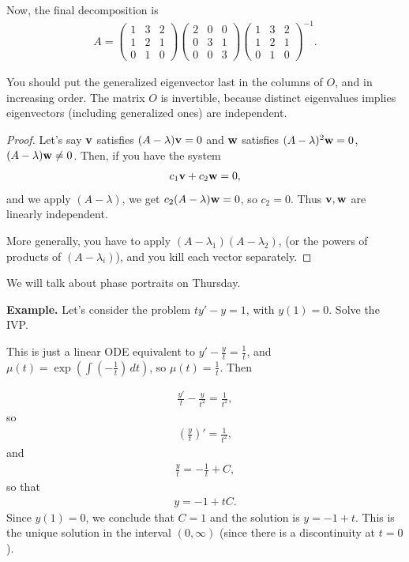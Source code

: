 \documentclass{article}
\newcommand{\mat}[1]{\begin{pmatrix}#1\end{pmatrix}}
\begin{document}
Now, the final decomposition is
\begin{align*}
  A = \mat{1 & 3 & 2 \\ 1 & 2 & 1 \\ 0 & 1 & 0} \mat{2 & 0 & 0 \\ 0 & 3 & 1 \\ 0 & 0 & 3} \mat{1 & 3 & 2 \\ 1 & 2 & 1 \\ 0 & 1 & 0}^{-1}.
\end{align*}

You should put the generalized eigenvector last in the columns of $O$, and in increasing order.  The matrix $O$ is invertible, because distinct eigenvalues implies eigenvectors (including generalized ones) are independent.

\begin{proof}
  Let's say $\mathbf{v}$ satisfies $(A - \lambda) \mathbf{v} = 0$ and $\mathbf{w}$ satisfies $(A - \lambda)^2 \mathbf{w} = 0$, $(A - \lambda) \mathbf{w} \neq 0$.  Then, if you have the system
  \begin{align*}
    c_1 \mathbf{v} + c_2 \mathbf{w} = 0,
  \end{align*}
  and we apply $(A - \lambda)$, we get $c_2 (A - \lambda) \mathbf{w} = 0$, so $c_2 = 0$.  Thus $\mathbf{v}, \mathbf{w}$ are linearly independent.

  More generally, you have to apply $(A-\lambda_1)(A - \lambda_2)$, (or the powers of products of $(A - \lambda_i)$), and you kill each vector separately.
\end{proof}

We will talk about phase portraits on Thursday.

{\bf Example.} Let's consider the problem $ty' - y = 1$, with $y(1) = 0$.  Solve the IVP.

This is just a linear ODE equivalent to $y' - \frac{y}{t} = \frac{1}{t}$, and $\mu(t) = \exp \left( \int (-\frac{1}{t}) \, dt \right)$, so $\mu(t)= \frac{1}{t}$.  Then

\begin{align*}
  \frac{y'}{t} - \frac{y}{t^2} = \frac{1}{t^2},
\end{align*}
so
\begin{align*}
  (\frac{y}{t})' = \frac{1}{t^2},
\end{align*}
and
\begin{align*}
  \frac{y}{t} = - \frac{1}{t}  +C,
\end{align*}
so that
\begin{align*}
  y = - 1 + tC.
\end{align*}
Since $y(1) = 0$, we conclude that $C = 1$ and the solution is $y = -1 + t$.  This is the unique solution in the interval $(0, \infty)$ (since there is a discontinuity at $t = 0$).
\end{document}
